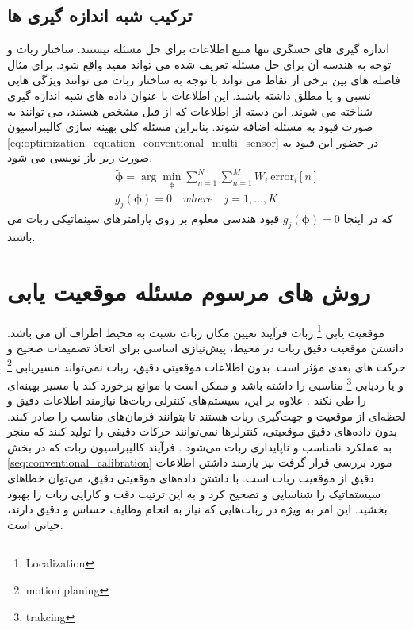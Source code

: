 \subsection{ترکیب شبه اندازه گیری ها}
اندازه گیری های حسگری تنها منبع اطلاعات برای حل مسئله نیستند. ساختار ربات و توحه به هندسه آن برای حل مسئله تعریف شده می تواند مفید واقع شود. برای مثال فاصله های بین برخی از نقاط می تواند با توجه به ساختار ربات می توانند ویژگی هایی نسبی و یا مطلق داشته باشند. این اطلاعات با عنوان داده های شبه اندازه گیری شناخته می شوند. این دسته از اطلاعات که از قبل مشخص هستند، می توانند به صورت قیود به مسئله اضافه شوند. بنابراین مسئله کلی بهینه سازی کالیبراسیون
\ref{eq:optimization_equation_conventional_multi_sensor}
در حضور این قیود به صورت زیر باز نویسی می شود. 
\begin{equation}
	\begin{aligned} \label{eq:optimization_equation_conventional_multi_sensor_measurement}
		&\tilde{\boldsymbol{\phi}} =  \arg\min_{\boldsymbol{\phi}} \sum_{n = 1 }^{N} \sum_{n = 1 }^{M} W_i~\text{error}_i[n] \\
		\quad &g_j(\boldsymbol{\phi}) = 0 \quad where \quad j = 1, \ldots, K
	\end{aligned}
\end{equation}
که در اینجا
$g_j(\boldsymbol{\phi}) = 0$ 
قیود هندسی معلوم بر روی پارامترهای سینماتیکی ربات می باشند.

\section{روش های مرسوم مسئله موقعیت یابی}
موقعیت یابی
\footnote{Localization}
 ربات فرآیند تعیین مکان ربات نسبت به محیط اطراف آن می باشد. دانستن موقعیت دقیق ربات در محیط، پیش‌نیازی اساسی برای اتخاذ تصمیمات صحیح و حرکت های بعدی مؤثر است. بدون اطلاعات موقعیتی دقیق، ربات نمی‌تواند مسیریابی
\footnote{motion planing}
  و یا ردیابی
\footnote{trakcing}
مناسبی را داشته باشد و ممکن است با موانع برخورد کند یا مسیر بهینه‌ای را طی نکند
\cite{ahmad2013cooperative}.
 علاوه بر این، سیستم‌های کنترلی ربات‌ها نیازمند اطلاعات دقیق و لحظه‌ای از موقعیت و جهت‌گیری ربات هستند تا بتوانند فرمان‌های مناسب را صادر کنند. بدون داده‌های دقیق موقعیتی، کنترلرها نمی‌توانند حرکات دقیقی را تولید کنند که منجر به عملکرد نامناسب و ناپایداری ربات می‌شود
\cite{guibas1997robot}.
فرآیند کالیبراسیون ربات که در بخش 
\ref{seq:conventional_calibration}
مورد بررسی قرار گرفت نیز یازمند داشتن اطلاعات دقیق از موقعیت ربات است. با داشتن داده‌های موقعیتی دقیق، می‌توان خطاهای سیستماتیک را شناسایی و تصحیح کرد و به این ترتیب دقت و کارایی ربات را بهبود بخشید. این امر به ویژه در ربات‌هایی که نیاز به انجام وظایف حساس و دقیق دارند، حیاتی است. 

